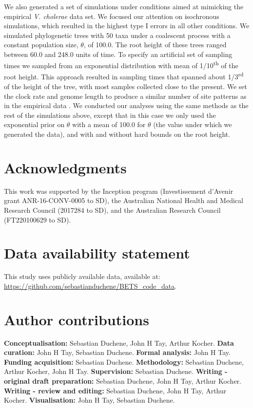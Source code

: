 \documentclass[10pt,letterpaper]{article}
\begin{document}
{We also generated a set of simulations under conditions aimed at mimicking the empirical \textit{V. cholerae} data set. We focused our attention on isochronous simulations, which resulted in the highest type I errors in all other conditions. We simulated phylogenetic trees with 50 taxa under a coalescent process with a constant population size, $\theta$, of 100.0. The root height of these trees ranged between 60.0 and 248.0 units of time. To specify an artificial set of sampling times we sampled from an exponential distribution with mean of 1/10\textsuperscript{th} of the root height. This approach resulted in sampling times that spanned about 1/3\textsuperscript{rd} of the height of the tree, with most samples collected close to the present. We set the clock rate and genome length to produce a similar number of site patterns as in the empirical data \cite{devault2014second}. We conducted our analyses using the same methods as the rest of the simulations above, except that in this case we only used the exponential prior on $\theta$ with a mean of 100.0 for $\theta$ (the value under which we generated the data), and with and without hard bounds on the root height.}



\section*{Acknowledgments}
This work was supported by the Inception program (Investissement d’Avenir grant ANR-16-CONV-0005 to SD), the Australian National Health and Medical Research Council (2017284 to SD), and the Australian Research Council (FT220100629 to SD).

\section*{Data availability statement}
This study uses publicly available data, available at: \url{https://github.com/sebastianduchene/BETS\_code\_data}.


\section*{Author contributions}

\textbf{Conceptualisation:} Sebastian Duchene, John H Tay, Arthur Kocher. \newline
\textbf{Data curation:} John H Tay, Sebastian Duchene. \newline
\textbf{Formal analysis:} John H Tay. \newline
\textbf{Funding acquisition:} Sebastian Duchene.  \newline
\textbf{Methodology:} Sebastian Duchene, Arthur Kocher, John H Tay.  \newline
\textbf{Supervision:} Sebastian Duchene. \newline
\textbf{Writing - original draft preparation:} Sebastian Duchene, John H Tay, Arthur Kocher. \newline
\textbf{Writing - review and editing:} Sebastian Duchene, John H Tay, Arthur Kocher. \newline
\textbf{Visualisation:} John H Tay, Sebastian Duchene. \newline
\end{document}
